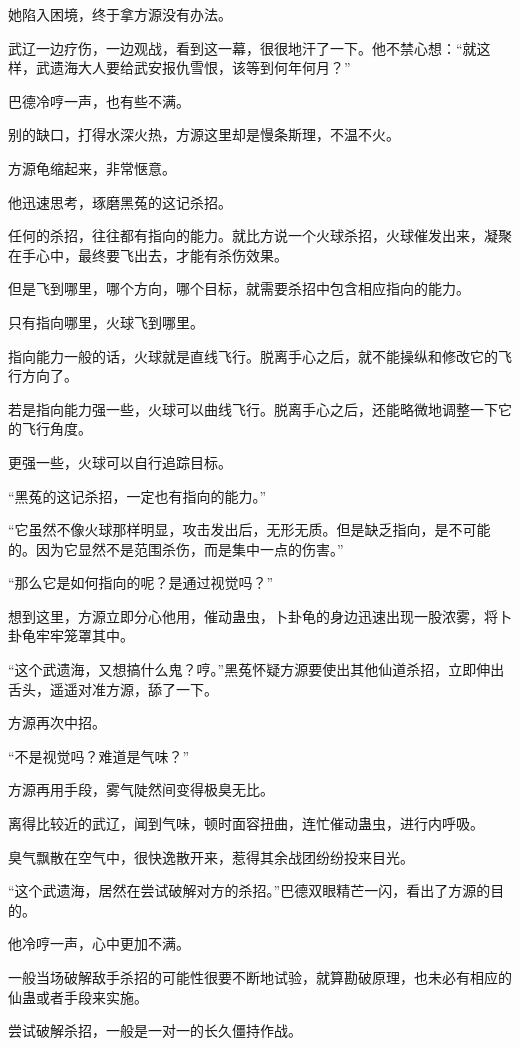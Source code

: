 \begin{this_body}
她陷入困境，终于拿方源没有办法。

武辽一边疗伤，一边观战，看到这一幕，很很地汗了一下。他不禁心想：“就这样，武遗海大人要给武安报仇雪恨，该等到何年何月？”

巴德冷哼一声，也有些不满。

别的缺口，打得水深火热，方源这里却是慢条斯理，不温不火。

方源龟缩起来，非常惬意。

他迅速思考，琢磨黑菟的这记杀招。

任何的杀招，往往都有指向的能力。就比方说一个火球杀招，火球催发出来，凝聚在手心中，最终要飞出去，才能有杀伤效果。

但是飞到哪里，哪个方向，哪个目标，就需要杀招中包含相应指向的能力。

只有指向哪里，火球飞到哪里。

指向能力一般的话，火球就是直线飞行。脱离手心之后，就不能操纵和修改它的飞行方向了。

若是指向能力强一些，火球可以曲线飞行。脱离手心之后，还能略微地调整一下它的飞行角度。

更强一些，火球可以自行追踪目标。

“黑菟的这记杀招，一定也有指向的能力。”

“它虽然不像火球那样明显，攻击发出后，无形无质。但是缺乏指向，是不可能的。因为它显然不是范围杀伤，而是集中一点的伤害。”

“那么它是如何指向的呢？是通过视觉吗？”

想到这里，方源立即分心他用，催动蛊虫，卜卦龟的身边迅速出现一股浓雾，将卜卦龟牢牢笼罩其中。

“这个武遗海，又想搞什么鬼？哼。”黑菟怀疑方源要使出其他仙道杀招，立即伸出舌头，遥遥对准方源，舔了一下。

方源再次中招。

“不是视觉吗？难道是气味？”

方源再用手段，雾气陡然间变得极臭无比。

离得比较近的武辽，闻到气味，顿时面容扭曲，连忙催动蛊虫，进行内呼吸。

臭气飘散在空气中，很快逸散开来，惹得其余战团纷纷投来目光。

“这个武遗海，居然在尝试破解对方的杀招。”巴德双眼精芒一闪，看出了方源的目的。

他冷哼一声，心中更加不满。

一般当场破解敌手杀招的可能性很要不断地试验，就算勘破原理，也未必有相应的仙蛊或者手段来实施。

尝试破解杀招，一般是一对一的长久僵持作战。


\end{this_body}
